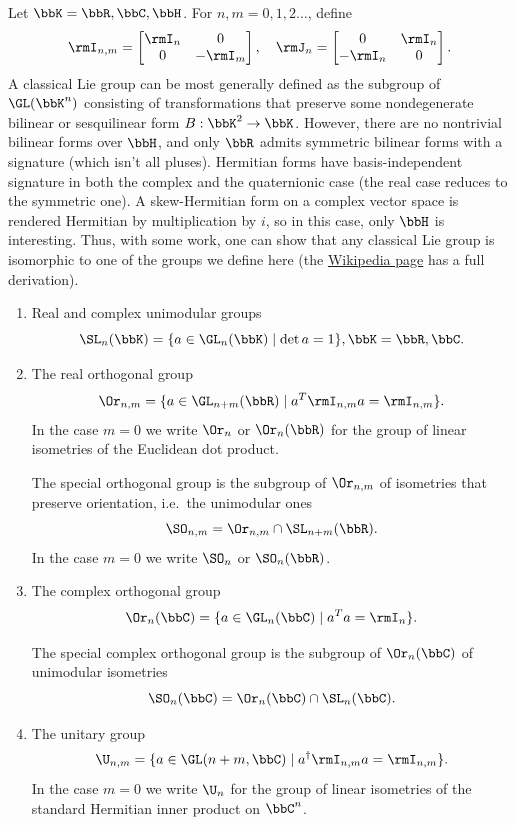 \begin{example}
    Let $\bbK=\bbR,\bbC,\bbH$. For $n,m=0,1,2\ldots$, define
    \[\rmI_{n,m}=
    \begin{bmatrix}
        \rmI_n&0\\0&-\rmI_m
    \end{bmatrix},\quad \rmJ_n=
    \begin{bmatrix}
        0&\rmI_n\\-\rmI_n&0
    \end{bmatrix}.
    \]
    A classical Lie group can be most generally defined as the subgroup of $\GL(\bbK^n)$ consisting of transformations that preserve some nondegenerate bilinear or sesquilinear form $B:\bbK^2\to \bbK$. However, there are no nontrivial bilinear forms over $\bbH$, and only $\bbR$ admits symmetric bilinear forms with a signature (which isn't all pluses). Hermitian forms have basis-independent signature in both the complex and the quaternionic case (the real case reduces to the symmetric one). A skew-Hermitian form on a complex vector space is rendered Hermitian by multiplication by $i$, so in this case, only $\bbH$ is interesting. Thus, with some work, one can show that any classical Lie group is isomorphic to one of the groups we define here (the \href{https://en.wikipedia.org/wiki/Classical_group}{Wikipedia page} has a full derivation).
    \begin{enumerate}
        \item Real and complex unimodular groups
        \[\SL_n(\bbK)=\{a\in\GL_n(\bbK)\mid \det a=1\}, \bbK=\bbR,\bbC.\]
        \item The real orthogonal group
        \[\Or_{n,m}=\{a\in\GL_{n+m}(\bbR)\mid a^T \rmI_{n,m}a=\rmI_{n,m}\}.\]
        In the case $m=0$ we write $\Or_n$ or $\Or_n(\bbR)$ for the group of linear isometries of the Euclidean dot product.

        The special orthogonal group is the subgroup of $\Or_{n,m}$ of isometries that preserve orientation, i.e.~the unimodular ones
        \[\SO_{n,m}=\Or_{n,m}\cap \SL_{n+m}(\bbR).\]
        In the case $m=0$ we write $\SO_n$ or $\SO_n(\bbR)$.
        \item The complex orthogonal group
        \[\Or_{n}(\bbC)=\{a\in\GL_{n}(\bbC)\mid a^T a=\rmI_{n}\}.\]

        The special complex orthogonal group is the subgroup of $\Or_{n}(\bbC)$ of unimodular isometries
        \[\SO_{n}(\bbC)=\Or_{n}(\bbC)\cap \SL_{n}(\bbC).\]
        \item The unitary group
        \[\U_{n,m}=\{a\in \GL(n+m,\bbC)\mid a^\dagger \rmI_{n,m}a=\rmI_{n,m}\}.\]
        In the case $m=0$ we write $\U_n$ for the group of linear isometries of the standard Hermitian inner product on $\bbC^n$.


\end{enumerate}
\end{example}
